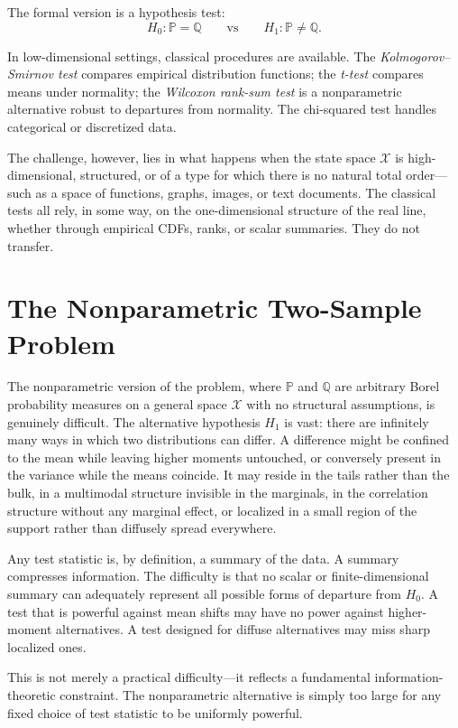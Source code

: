 \documentclass[12pt, oneside]{book}
\theoremstyle{plain}
\theoremstyle{definition}
\newcommand{\calX}{\mathcal{X}}
\newcommand{\PP}{\mathbb{P}}
\newcommand{\QQ}{\mathbb{Q}}
\begin{document}
The formal version is a hypothesis test:
\begin{equation}
H_0: \PP = \QQ \qquad \text{vs} \qquad H_1: \PP \neq \QQ.
\label{eq:twosample}
\end{equation}

In low-dimensional settings, classical procedures are available. The \emph{Kolmogorov--Smirnov test} compares empirical distribution functions; the \emph{t-test} compares means under normality; the \emph{Wilcoxon rank-sum test} is a nonparametric alternative robust to departures from normality. The chi-squared test handles categorical or discretized data.

The challenge, however, lies in what happens when the state space $\calX$ is high-dimensional, structured, or of a type for which there is no natural total order---such as a space of functions, graphs, images, or text documents. The classical tests all rely, in some way, on the one-dimensional structure of the real line, whether through empirical CDFs, ranks, or scalar summaries. They do not transfer.

\section{The Nonparametric Two-Sample Problem}

The nonparametric version of the problem, where $\PP$ and $\QQ$ are arbitrary Borel probability measures on a general space $\calX$ with no structural assumptions, is genuinely difficult. The alternative hypothesis $H_1$ is vast: there are infinitely many ways in which two distributions can differ. A difference might be confined to the mean while leaving higher moments untouched, or conversely present in the variance while the means coincide. It may reside in the tails rather than the bulk, in a multimodal structure invisible in the marginals, in the correlation structure without any marginal effect, or localized in a small region of the support rather than diffusely spread everywhere.

Any test statistic is, by definition, a summary of the data. A summary compresses information. The difficulty is that no scalar or finite-dimensional summary can adequately represent all possible forms of departure from $H_0$. A test that is powerful against mean shifts may have no power against higher-moment alternatives. A test designed for diffuse alternatives may miss sharp localized ones.

This is not merely a practical difficulty---it reflects a fundamental information-theoretic constraint. The nonparametric alternative is simply too large for any fixed choice of test statistic to be uniformly powerful.
\end{document}
